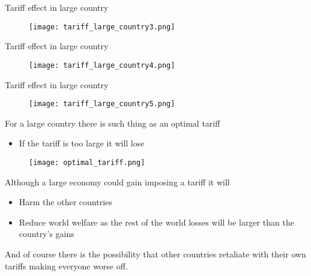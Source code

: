 \documentclass{beamer}
\begin{document}
\begin{frame}{Tariff effect in large country}
  \begin{figure}
    \texttt{[image: tariff\_large\_country3.png]}
  \end{figure}
\end{frame}

\begin{frame}{Tariff effect in large country}
  \begin{figure}
    \texttt{[image: tariff\_large\_country4.png]}
  \end{figure}
\end{frame}

\begin{frame}{Tariff effect in large country}
  \begin{figure}
    \texttt{[image: tariff\_large\_country5.png]}
  \end{figure}
\end{frame}

\begin{frame}
  For a large country there is such thing as an optimal tariff
  \begin{itemize}
    \item If the tariff is too large it will lose
  \end{itemize}
  \begin{figure}
    \texttt{[image: optimal\_tariff.png]}
  \end{figure}
\end{frame}

\begin{frame}
 Although a large economy could gain imposing a tariff it will
 \begin{itemize}
   \item Harm the other countries
   \item Reduce world welfare as the rest of the world losses will be larger than the country's gains
 \end{itemize}
 \medskip
 And of course there is the possibility that other countries retaliate with their own tariffs making everyone worse off.
\end{frame}
\end{document}
